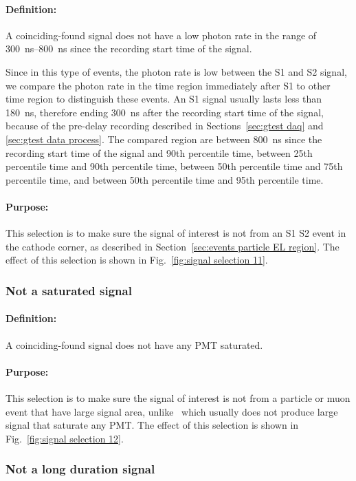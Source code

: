 \paragraph{Definition:}
A coinciding-found signal does not have a low photon rate in the range of \SIrange{300}{800}{\ns} since the recording start time of the signal. 

Since in this type of events, the photon rate is low between the S1 and S2 signal, we compare the photon rate in the time region immediately after S1 to other time region to distinguish these events. An S1 signal usually lasts less than \SI{180}{\ns}, therefore ending \SI{300}{\ns} after the recording start time of the signal, because of the pre-delay recording described in Sections~\ref{sec:gtest daq} and \ref{sec:gtest data process}. The compared region are between \SI{800}{\ns} since the recording start time of the signal and 90th percentile time, between 25th percentile time and 90th percentile time, between 50th percentile time and 75th percentile time, and between 50th percentile time and 95th percentile time.

\paragraph{Purpose:}
This selection is to make sure the signal of interest is not from an S1 S2 event in the cathode corner, as described in Section~\ref{sec:events particle EL region}. The effect of this selection is shown in Fig.~\ref{fig:signal selection 11}.

\subsubsection{Not a saturated signal}
\paragraph{Definition:}
A coinciding-found signal does not have any PMT saturated.
\paragraph{Purpose:}
This selection is to make sure the signal of interest is not from a particle or muon event that have large signal area, unlike \ees\ which usually does not produce large signal that saturate any PMT. The effect of this selection is shown in Fig.~\ref{fig:signal selection 12}.

\subsubsection{Not a long duration signal}

